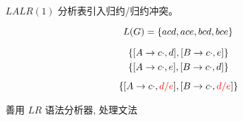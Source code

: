 \begin{frame}{}
  \begin{center}

    \begin{theorem}
      $LALR(1)$ 分析表引入归约/归约冲突。
    \end{theorem}

    \pause
    \[
      L(G) = \{acd, ace, bcd, bce\}
    \]

    \pause
    \vspace{-0.30cm}
    \begin{gather*}
      \{[A \to c \cdot, d], [B \to c \cdot, e]\} \\
      \{[A \to c \cdot, e], [B \to c \cdot, d]\} \\[5pt]
      \{[A \to c \cdot, \textcolor{red}{d/e}], [B \to c \cdot, \textcolor{red}{d/e}]\} \\
    \end{gather*}
  \end{center}
\end{frame}

\begin{frame}{}
  \begin{center}
     善用 $LR$ 语法分析器, 处理文法

  \end{center}
\end{frame}

\begin{frame}{}
  \begin{center}

    \begin{columns}
        
        
    \end{columns}

    
  \end{center}
\end{frame}


